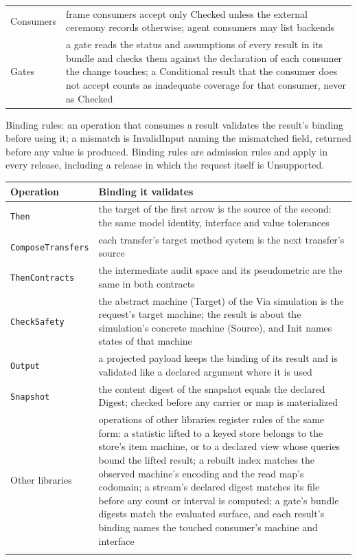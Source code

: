 \documentclass[11pt]{article}
\newcommand{\code}[1]{\texttt{#1}}
\theoremstyle{definition}
\theoremstyle{plain}
\begin{document}
{\begin{longtable}{>{\raggedright\arraybackslash}p{5.4cm}>{\raggedright\arraybackslash}p{9.0cm}}
Consumers & frame consumers accept only Checked unless the external ceremony records otherwise; agent consumers may list backends\\ \addlinespace[3pt]
Gates & a gate reads the status and assumptions of every result in its bundle and checks them against the declaration of each consumer the change touches; a Conditional result that the consumer does not accept counts as inadequate coverage for that consumer,\allowbreak{} never as Checked\\
\bottomrule\end{longtable}}
Binding rules: an operation that consumes a result validates the result's binding before using it; a mismatch is InvalidInput naming the mismatched field,\allowbreak{} returned before any value is produced. Binding rules are admission rules and apply in every release,\allowbreak{} including a release in which the request itself is Unsupported.
{\footnotesize\begin{longtable}{>{\raggedright\arraybackslash}p{3.0cm}>{\raggedright\arraybackslash}p{11.4cm}}
\toprule Operation & Binding it validates\\ \midrule \endhead
\code{Then} & the target of the first arrow is the source of the second: the same model identity,\allowbreak{} interface and value tolerances\\ \addlinespace[3pt]
\code{ComposeTransfers} & each transfer's target method system is the next transfer's source\\ \addlinespace[3pt]
\code{ThenContracts} & the intermediate audit space and its pseudometric are the same in both contracts\\ \addlinespace[3pt]
\code{CheckSafety} & the abstract machine (Target) of the Via simulation is the request's target machine; the result is about the simulation's concrete machine (Source),\allowbreak{} and Init names states of that machine\\ \addlinespace[3pt]
\code{Output} & a projected payload keeps the binding of its result and is validated like a declared argument where it is used\\ \addlinespace[3pt]
\code{Snapshot} & the content digest of the snapshot equals the declared Digest; checked before any carrier or map is materialized\\ \addlinespace[3pt]
Other libraries & operations of other libraries register rules of the same form: a statistic lifted to a keyed store belongs to the store's item machine,\allowbreak{} or to a declared view whose queries bound the lifted result; a rebuilt index matches the observed machine's encoding and the read map's codomain; a stream's declared digest matches its file before any count or interval is computed; a gate's bundle digests match the evaluated surface,\allowbreak{} and each result's binding names the touched consumer's machine and interface\\ \addlinespace[3pt]
\bottomrule\end{longtable}}
\end{document}
